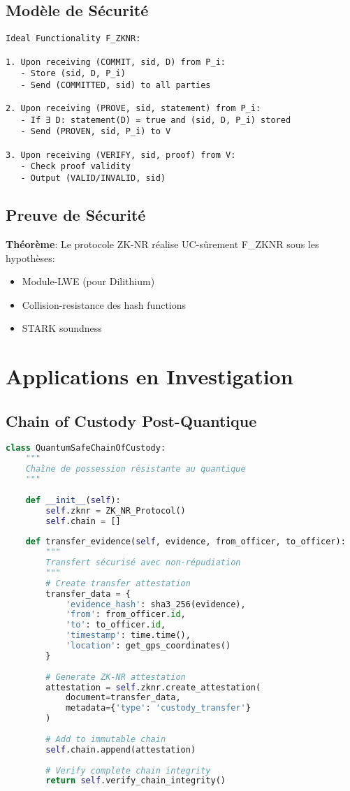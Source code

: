 \subsection{Modèle de Sécurité}
\begin{verbatim}
Ideal Functionality F_ZKNR:

1. Upon receiving (COMMIT, sid, D) from P_i:
   - Store (sid, D, P_i)
   - Send (COMMITTED, sid) to all parties

2. Upon receiving (PROVE, sid, statement) from P_i:
   - If ∃ D: statement(D) = true and (sid, D, P_i) stored
   - Send (PROVEN, sid, P_i) to V

3. Upon receiving (VERIFY, sid, proof) from V:
   - Check proof validity
   - Output (VALID/INVALID, sid)
\end{verbatim}

\subsection{Preuve de Sécurité}
\textbf{Théorème}: Le protocole ZK-NR réalise UC-sûrement F_ZKNR sous les hypothèses:

\begin{itemize}
\item Module-LWE (pour Dilithium)
\item Collision-resistance des hash functions
\item STARK soundness
\end{itemize}

\section{Applications en Investigation}
\subsection{Chain of Custody Post-Quantique}
\begin{lstlisting}[language=Python, caption=Chaîne de possession résistante au quantique]
class QuantumSafeChainOfCustody:
    """
    Chaîne de possession résistante au quantique
    """
    
    def __init__(self):
        self.zknr = ZK_NR_Protocol()
        self.chain = []
    
    def transfer_evidence(self, evidence, from_officer, to_officer):
        """
        Transfert sécurisé avec non-répudiation
        """
        # Create transfer attestation
        transfer_data = {
            'evidence_hash': sha3_256(evidence),
            'from': from_officer.id,
            'to': to_officer.id,
            'timestamp': time.time(),
            'location': get_gps_coordinates()
        }
        
        # Generate ZK-NR attestation
        attestation = self.zknr.create_attestation(
            document=transfer_data,
            metadata={'type': 'custody_transfer'}
        )
        
        # Add to immutable chain
        self.chain.append(attestation)
        
        # Verify complete chain integrity
        return self.verify_chain_integrity()
\end{lstlisting}

